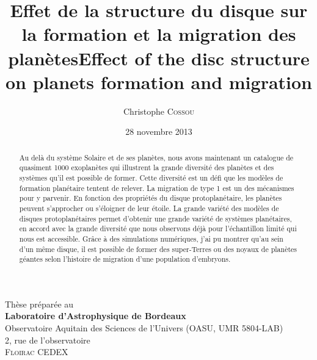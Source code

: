 \documentclass[logos,chaptertoc]{bordeaux-thesis} %
\author{Christophe \textsc{Cossou}}
\title{Effet de la structure du disque sur la formation et la migration des planètes}
\title[english]{Effect of the disc structure on planets formation and migration}
\date{28 novembre 2013}
\begin{document}
\maketitle%

\pagestyle{empty}

\cleardoublepage
\null
\vfill
\noindent
{}\hfill
  \begin{minipage}[b]{.75\textwidth}
  \noindent Th\`{e}se pr\'{e}par\'{e}e au\\{\footnotesize
    \textbf{Laboratoire d'Astrophysique de Bordeaux}\\
    Observatoire Aquitain des Sciences de l'Univers (OASU, UMR 5804-LAB)\\
    2, rue de l'observatoire\\
     \textsc{Floirac CEDEX}}
  \end{minipage}
\hfill
\cleardoublepage



\begin{abstract}
Au delà du système Solaire et de ses planètes, nous avons maintenant un catalogue de quasiment 1000 exoplanètes qui illustrent la grande diversité des planètes et des systèmes qu'il est possible de former. Cette diversité est un défi que les modèles de formation planétaire tentent de relever. La migration de type 1 est un des mécanismes pour y parvenir. En fonction des propriétés du disque protoplanétaire, les planètes peuvent s'approcher ou s'éloigner de leur étoile. La grande variété des modèles de disques protoplanétaires permet d'obtenir une grande variété de systèmes planétaires, en accord avec la grande diversité que nous observons déjà pour l'échantillon limité qui nous est accessible. Grâce à des simulations numériques, j'ai pu montrer qu'au sein d'un même disque, il est possible de former des super-Terres ou des noyaux de planètes géantes selon l'histoire de migration d'une population d'embryons.
\end{abstract}

\noindent\hspace*{0.35\textwidth}\hrulefill\hspace*{0.35\textwidth}\\[-\bigskipamount]
\end{document}
